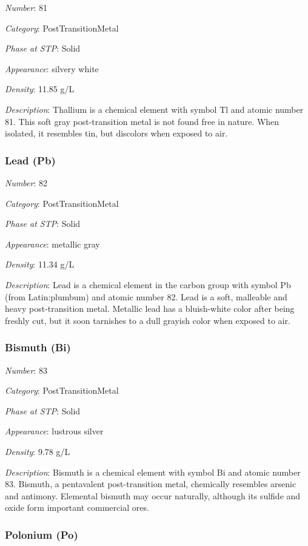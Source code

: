 \documentclass{article}
\begin{document}
\textit{Number}: 81

\textit{Category}: PostTransitionMetal

\textit{Phase at STP}: Solid

\textit{Appearance}: silvery white

\textit{Density}: 11.85 g/L

\textit{Description}: Thallium is a chemical element with symbol Tl and atomic number 81. This soft gray post-transition metal is not found free in nature. When isolated, it resembles tin, but discolors when exposed to air.

\hypertarget{subsubsection::Pb}{}\subsubsection{Lead (Pb)}

\textit{Number}: 82

\textit{Category}: PostTransitionMetal

\textit{Phase at STP}: Solid

\textit{Appearance}: metallic gray

\textit{Density}: 11.34 g/L

\textit{Description}: Lead is a chemical element in the carbon group with symbol Pb (from Latin:plumbum) and atomic number 82. Lead is a soft, malleable and heavy post-transition metal. Metallic lead has a bluish-white color after being freshly cut, but it soon tarnishes to a dull grayish color when exposed to air.

\hypertarget{subsubsection::Bi}{}\subsubsection{Bismuth (Bi)}

\textit{Number}: 83

\textit{Category}: PostTransitionMetal

\textit{Phase at STP}: Solid

\textit{Appearance}: lustrous silver

\textit{Density}: 9.78 g/L

\textit{Description}: Bismuth is a chemical element with symbol Bi and atomic number 83. Bismuth, a pentavalent post-transition metal, chemically resembles arsenic and antimony. Elemental bismuth may occur naturally, although its sulfide and oxide form important commercial ores.

\hypertarget{subsubsection::Po}{}\subsubsection{Polonium (Po)}
\end{document}
